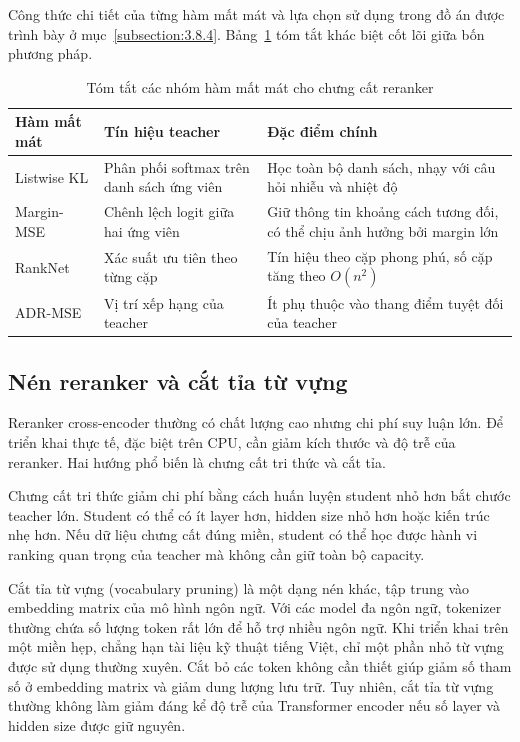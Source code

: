 \documentclass[../DoAn.tex]{subfiles}
\begin{document}
Công thức chi tiết của từng hàm mất mát và lựa chọn sử dụng trong đồ án được trình bày ở mục~\ref{subsection:3.8.4}. Bảng~\ref{tab:reranker-kd-loss-summary} tóm tắt khác biệt cốt lõi giữa bốn phương pháp.

\begin{table}[H]
\centering
\caption{Tóm tắt các nhóm hàm mất mát cho chưng cất reranker}
\label{tab:reranker-kd-loss-summary}
{\small
\setlength{\tabcolsep}{4pt}
\begin{tabular}{|>{\raggedright\arraybackslash}p{3.2cm}|>{\raggedright\arraybackslash}p{4.0cm}|>{\raggedright\arraybackslash}p{6.0cm}|}
\hline
\textbf{Hàm mất mát} & \textbf{Tín hiệu teacher} & \textbf{Đặc điểm chính} \\ \hline
Listwise KL & Phân phối softmax trên danh sách ứng viên & Học toàn bộ danh sách, nhạy với câu hỏi nhiễu và nhiệt độ \\ \hline
Margin-MSE & Chênh lệch logit giữa hai ứng viên & Giữ thông tin khoảng cách tương đối, có thể chịu ảnh hưởng bởi margin lớn \\ \hline
RankNet & Xác suất ưu tiên theo từng cặp & Tín hiệu theo cặp phong phú, số cặp tăng theo $O(n^2)$ \\ \hline
ADR-MSE & Vị trí xếp hạng của teacher & Ít phụ thuộc vào thang điểm tuyệt đối của teacher \\ \hline
\end{tabular}
}
\end{table}

\subsection{Nén reranker và cắt tỉa từ vựng}
\label{subsection:2.3.5}

Reranker cross-encoder thường có chất lượng cao nhưng chi phí suy luận lớn. Để triển khai thực tế, đặc biệt trên CPU, cần giảm kích thước và độ trễ của reranker. Hai hướng phổ biến là chưng cất tri thức và cắt tỉa.

Chưng cất tri thức giảm chi phí bằng cách huấn luyện student nhỏ hơn bắt chước teacher lớn. Student có thể có ít layer hơn, hidden size nhỏ hơn hoặc kiến trúc nhẹ hơn. Nếu dữ liệu chưng cất đúng miền, student có thể học được hành vi ranking quan trọng của teacher mà không cần giữ toàn bộ capacity.

Cắt tỉa từ vựng (vocabulary pruning) là một dạng nén khác, tập trung vào embedding matrix của mô hình ngôn ngữ. Với các model đa ngôn ngữ, tokenizer thường chứa số lượng token rất lớn để hỗ trợ nhiều ngôn ngữ. Khi triển khai trên một miền hẹp, chẳng hạn tài liệu kỹ thuật tiếng Việt, chỉ một phần nhỏ từ vựng được sử dụng thường xuyên. Cắt bỏ các token không cần thiết giúp giảm số tham số ở embedding matrix và giảm dung lượng lưu trữ. Tuy nhiên, cắt tỉa từ vựng thường không làm giảm đáng kể độ trễ của Transformer encoder nếu số layer và hidden size được giữ nguyên.
\end{document}
